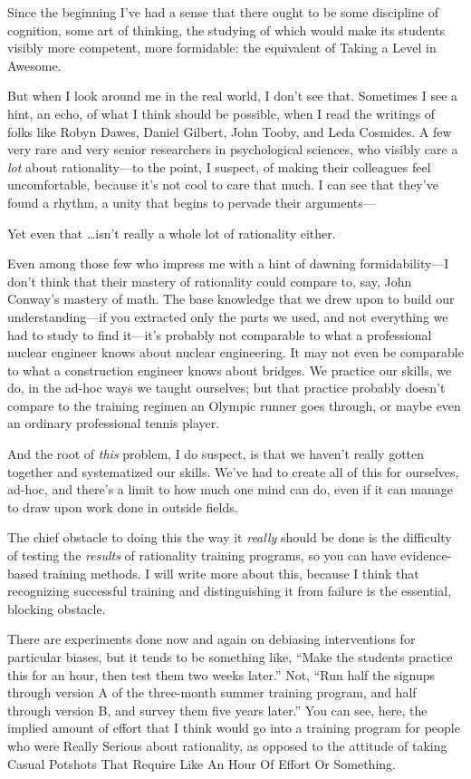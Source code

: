 {
 Since the beginning I've had a sense that there
ought to be some discipline of cognition, some art of thinking, the
studying of which would make its students visibly more competent, more
formidable: the equivalent of Taking a Level in Awesome.}

{
 But when I look around me in the real world, I
don't see that. Sometimes I see a hint, an echo, of
what I think should be possible, when I read the writings of folks like
Robyn Dawes, Daniel Gilbert, John Tooby, and Leda Cosmides. A few very
rare and very senior researchers in psychological sciences, who visibly
care a \textit{lot} about rationality---to the point, I suspect, of
making their colleagues feel uncomfortable, because
it's not cool to care that much. I can see that
they've found a rhythm, a unity that begins to pervade
their arguments---}

{
 Yet even that \ldots isn't really a whole lot of
rationality either.}

{
 Even among those few who impress me with a hint of dawning
formidability---I don't think that their mastery of
rationality could compare to, say, John Conway's
mastery of math. The base knowledge that we drew upon to build our
understanding---if you extracted only the parts we used, and not
everything we had to study to find it---it's probably
not comparable to what a professional nuclear engineer knows about
nuclear engineering. It may not even be comparable to what a
construction engineer knows about bridges. We practice our skills, we
do, in the ad-hoc ways we taught ourselves; but that practice probably
doesn't compare to the training regimen an Olympic
runner goes through, or maybe even an ordinary professional tennis
player.}

{
 And the root of \textit{this} problem, I do suspect, is that we
haven't really gotten together and systematized our
skills. We've had to create all of this for ourselves,
ad-hoc, and there's a limit to how much one mind can
do, even if it can manage to draw upon work done in outside fields.}

{
 The chief obstacle to doing this the way it \textit{really} should
be done is the difficulty of testing the \textit{results} of
rationality training programs, so you can have evidence-based training
methods. I will write more about this, because I think that recognizing
successful training and distinguishing it from failure is the
essential, blocking obstacle.}

{
 There are experiments done now and again on debiasing
interventions for particular biases, but it tends to be something like,
``Make the students practice this for an hour, then
test them two weeks later.'' Not,
``Run half the signups through version A of the
three-month summer training program, and half through version B, and
survey them five years later.'' You can see, here,
the implied amount of effort that I think would go into a training
program for people who were Really Serious about rationality, as
opposed to the attitude of taking Casual Potshots That Require Like An
Hour Of Effort Or Something.}

